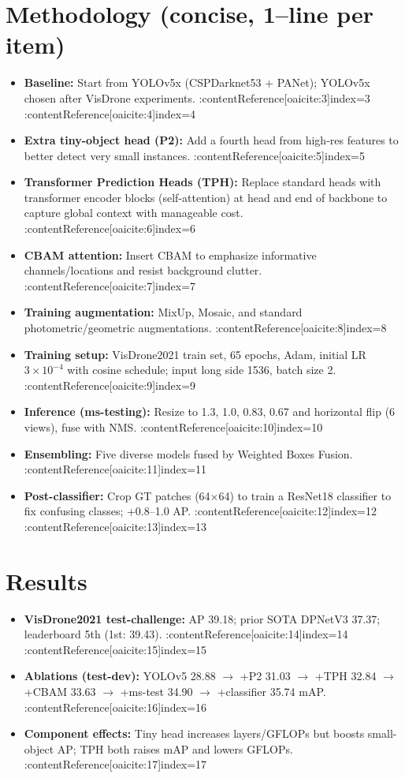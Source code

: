 \documentclass[11pt]{article}
\begin{document}
\section*{Methodology (concise, 1–line per item)}
\begin{itemize}
  \item \textbf{Baseline:} Start from YOLOv5x (CSPDarknet53 + PANet); YOLOv5x chosen after VisDrone experiments. :contentReference[oaicite:3]{index=3} :contentReference[oaicite:4]{index=4}
  \item \textbf{Extra tiny-object head (P2):} Add a fourth head from high-res features to better detect very small instances. :contentReference[oaicite:5]{index=5}
  \item \textbf{Transformer Prediction Heads (TPH):} Replace standard heads with transformer encoder blocks (self-attention) at head and end of backbone to capture global context with manageable cost. :contentReference[oaicite:6]{index=6}
  \item \textbf{CBAM attention:} Insert CBAM to emphasize informative channels/locations and resist background clutter. :contentReference[oaicite:7]{index=7}
  \item \textbf{Training augmentation:} MixUp, Mosaic, and standard photometric/geometric augmentations. :contentReference[oaicite:8]{index=8}
  \item \textbf{Training setup:} VisDrone2021 train set, 65 epochs, Adam, initial LR $3\!\times\!10^{-4}$ with cosine schedule; input long side 1536, batch size 2. :contentReference[oaicite:9]{index=9}
  \item \textbf{Inference (ms-testing):} Resize to 1.3, 1.0, 0.83, 0.67 and horizontal flip (6 views), fuse with NMS. :contentReference[oaicite:10]{index=10}
  \item \textbf{Ensembling:} Five diverse models fused by Weighted Boxes Fusion. :contentReference[oaicite:11]{index=11}
  \item \textbf{Post-classifier:} Crop GT patches (64$\times$64) to train a ResNet18 classifier to fix confusing classes; +0.8–1.0 AP. :contentReference[oaicite:12]{index=12} :contentReference[oaicite:13]{index=13}
\end{itemize}

\section*{Results}
\begin{itemize}
  \item \textbf{VisDrone2021 test-challenge:} AP 39.18; prior SOTA DPNetV3 37.37; leaderboard 5th (1st: 39.43). :contentReference[oaicite:14]{index=14} :contentReference[oaicite:15]{index=15}
  \item \textbf{Ablations (test-dev):} YOLOv5 28.88 $\rightarrow$ +P2 31.03 $\rightarrow$ +TPH 32.84 $\rightarrow$ +CBAM 33.63 $\rightarrow$ +ms-test 34.90 $\rightarrow$ +classifier 35.74 mAP. :contentReference[oaicite:16]{index=16}
  \item \textbf{Component effects:} Tiny head increases layers/GFLOPs but boosts small-object AP; TPH both raises mAP and lowers GFLOPs. :contentReference[oaicite:17]{index=17}
\end{itemize}
\end{document}

